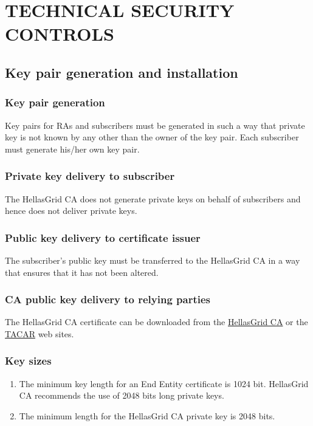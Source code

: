 
\chapter{TECHNICAL SECURITY CONTROLS}
\section{Key pair generation and installation}
\subsection{Key pair generation}

Key pairs for RAs and subscribers must be generated in such a way that private key is not known by any other than the owner of the key pair. Each subscriber must generate his/her own key pair. 

\subsection{Private key delivery to subscriber}

The HellasGrid CA does not generate private keys on behalf of subscribers and hence does not deliver private keys.

\subsection{Public key delivery to certificate issuer}

The subscriber's public key must be transferred to the HellasGrid CA in a way that ensures that it has not been altered.

\subsection{CA public key delivery to relying parties}

The HellasGrid CA certificate can be downloaded from the \href{http://www.grid.auth.gr/pki/hellasgrid-ca}{HellasGrid CA} or the \href{http://www.tacar.org}{TACAR} web sites.

\subsection{Key sizes}
\begin{enumerate}
\item{The minimum key length for an End Entity certificate is 1024 bit. HellasGrid CA recommends the use of 2048 bits long private keys.}
\item{The minimum length for the HellasGrid CA private key is 2048 bits.}
\end{enumerate}

